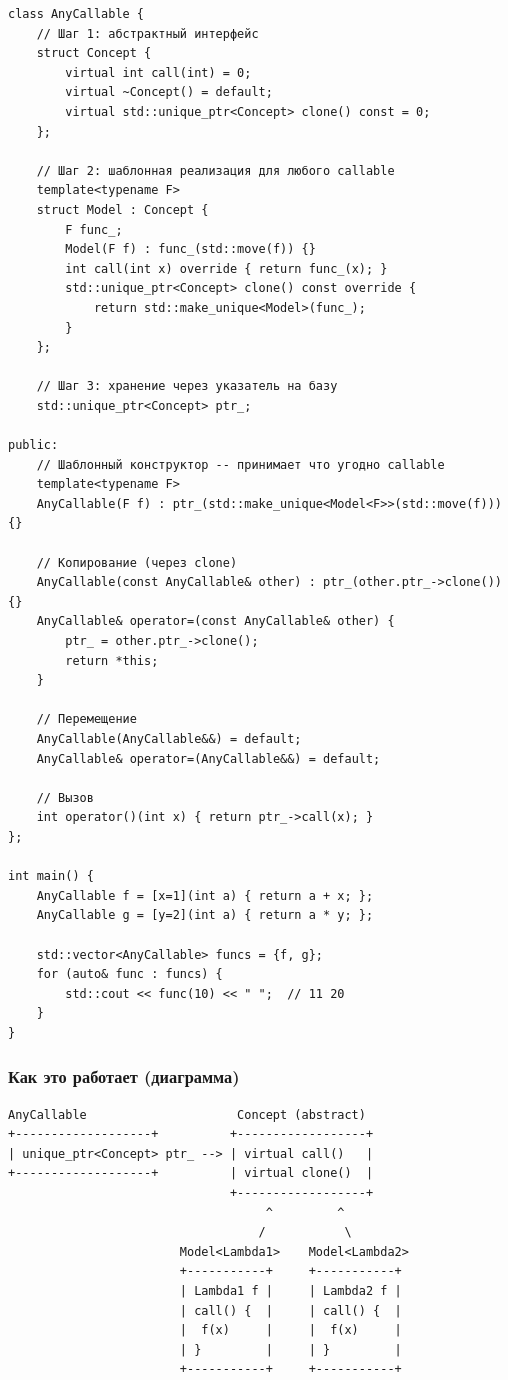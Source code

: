 \documentclass[a4paper,12pt]{article}
\begin{document}
\begin{lstlisting}
class AnyCallable {
    // Шаг 1: абстрактный интерфейс
    struct Concept {
        virtual int call(int) = 0;
        virtual ~Concept() = default;
        virtual std::unique_ptr<Concept> clone() const = 0;
    };

    // Шаг 2: шаблонная реализация для любого callable
    template<typename F>
    struct Model : Concept {
        F func_;
        Model(F f) : func_(std::move(f)) {}
        int call(int x) override { return func_(x); }
        std::unique_ptr<Concept> clone() const override {
            return std::make_unique<Model>(func_);
        }
    };

    // Шаг 3: хранение через указатель на базу
    std::unique_ptr<Concept> ptr_;

public:
    // Шаблонный конструктор -- принимает что угодно callable
    template<typename F>
    AnyCallable(F f) : ptr_(std::make_unique<Model<F>>(std::move(f))) {}

    // Копирование (через clone)
    AnyCallable(const AnyCallable& other) : ptr_(other.ptr_->clone()) {}
    AnyCallable& operator=(const AnyCallable& other) {
        ptr_ = other.ptr_->clone();
        return *this;
    }

    // Перемещение
    AnyCallable(AnyCallable&&) = default;
    AnyCallable& operator=(AnyCallable&&) = default;

    // Вызов
    int operator()(int x) { return ptr_->call(x); }
};

int main() {
    AnyCallable f = [x=1](int a) { return a + x; };
    AnyCallable g = [y=2](int a) { return a * y; };

    std::vector<AnyCallable> funcs = {f, g};
    for (auto& func : funcs) {
        std::cout << func(10) << " ";  // 11 20
    }
}
\end{lstlisting}

\subsubsection{Как это работает (диаграмма)}

\begin{verbatim}
AnyCallable                     Concept (abstract)
+-------------------+          +------------------+
| unique_ptr<Concept> ptr_ --> | virtual call()   |
+-------------------+          | virtual clone()  |
                               +------------------+
                                    ^         ^
                                   /           \
                        Model<Lambda1>    Model<Lambda2>
                        +-----------+     +-----------+
                        | Lambda1 f |     | Lambda2 f |
                        | call() {  |     | call() {  |
                        |  f(x)     |     |  f(x)     |
                        | }         |     | }         |
                        +-----------+     +-----------+
\end{verbatim}
\end{document}
